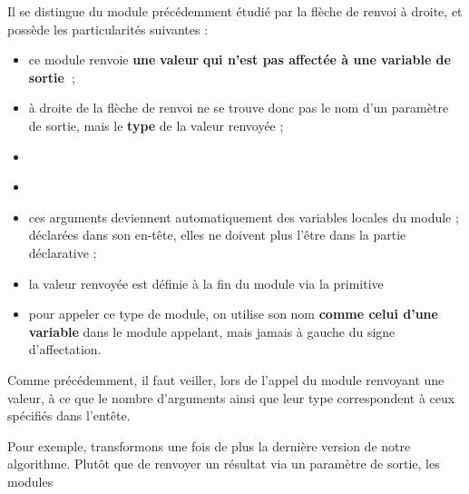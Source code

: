 {\sffamily
{}}

{
Il se distingue du module précédemment étudié par la flèche de renvoi à
droite, et possède les particularités suivantes :}

\liststyleListv
\begin{itemize}
\item {
{ce module renvoie
}{\textbf{une}}{
}{\textbf{valeur}}{
}{\textbf{qui n’est pas affectée à une variable
de
}}{\textbf{sortie~}}{;}}
\item {
{à droite de la flèche de renvoi ne se trouve
donc pas le nom d’un paramètre de sortie, mais le
}{\textbf{type}}{ de la
valeur renvoyée ;}}
\item {
}
\item {
}
\item {
ces arguments deviennent automatiquement des variables locales du module
; déclarées dans son en-tête, elles ne doivent plus l’être dans la
partie déclarative ;}
\item {
{la valeur renvoyée est définie à la fin du
module via la primitive
}}
\item {
pour appeler ce type de module, on utilise son nom \textbf{comme celui
d’une variable} dans le module appelant, mais jamais à gauche du signe
d’affectation.}
\end{itemize}
{
Comme précédemment, il faut veiller, lors de l’appel du module renvoyant
une valeur, à ce que le nombre d’arguments ainsi que leur type
correspondent à ceux spécifiés dans l’entête.}

{
{Pour exemple, transformons une fois de plus la
dernière version de notre algorithme. Plutôt que de renvoyer un
résultat via un paramètre de sortie, les modules
}}

